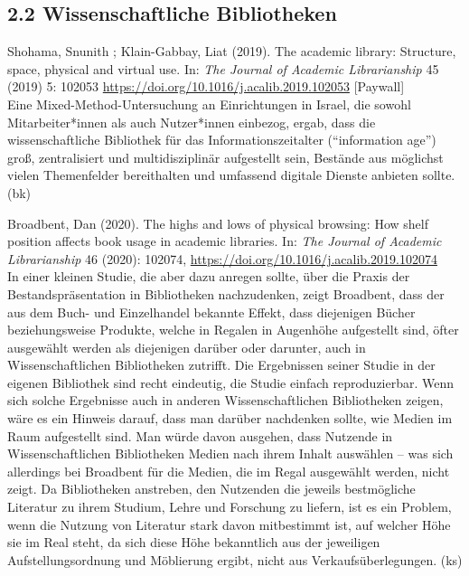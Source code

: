 \documentclass[a4paper,
fontsize=11pt,
oneside,
numbers=noperiodatend,
parskip=half-,
bibliography=totoc,
final
]{scrartcl}
\begin{document}
\hypertarget{wissenschaftliche-bibliotheken}{%
\subsection{2.2 Wissenschaftliche
Bibliotheken}\label{wissenschaftliche-bibliotheken}}

Shohama, Snunith ; Klain-Gabbay, Liat (2019). The academic library:
Structure, space, physical and virtual use. In: \emph{The Journal of
Academic Librarianship} 45 (2019) 5: 102053
\url{https://doi.org/10.1016/j.acalib.2019.102053} {[}Paywall{]}\\
Eine Mixed-Method-Untersuchung an Einrichtungen in Israel, die sowohl
Mitarbeiter*innen als auch Nutzer*innen einbezog, ergab, dass die
wissenschaftliche Bibliothek für das Informationszeitalter
(``information age'') groß, zentralisiert und multidisziplinär
aufgestellt sein, Bestände aus möglichst vielen Themenfelder
bereithalten und umfassend digitale Dienste anbieten sollte. (bk)

Broadbent, Dan (2020). The highs and lows of physical browsing: How
shelf position affects book usage in academic libraries. In: \emph{The
Journal of Academic Librarianship} 46 (2020): 102074,
\url{https://doi.org/10.1016/j.acalib.2019.102074}\\
In einer kleinen Studie, die aber dazu anregen sollte, über die Praxis
der Bestandspräsentation in Bibliotheken nachzudenken, zeigt Broadbent,
dass der aus dem Buch- und Einzelhandel bekannte Effekt, dass diejenigen
Bücher beziehungsweise Produkte, welche in Regalen in Augenhöhe
aufgestellt sind, öfter ausgewählt werden als diejenigen darüber oder
darunter, auch in Wissenschaftlichen Bibliotheken zutrifft. Die
Ergebnissen seiner Studie in der eigenen Bibliothek sind recht
eindeutig, die Studie einfach reproduzierbar. Wenn sich solche
Ergebnisse auch in anderen Wissenschaftlichen Bibliotheken zeigen, wäre
es ein Hinweis darauf, dass man darüber nachdenken sollte, wie Medien im
Raum aufgestellt sind. Man würde davon ausgehen, dass Nutzende in
Wissenschaftlichen Bibliotheken Medien nach ihrem Inhalt auswählen --
was sich allerdings bei Broadbent für die Medien, die im Regal
ausgewählt werden, nicht zeigt. Da Bibliotheken anstreben, den Nutzenden
die jeweils bestmögliche Literatur zu ihrem Studium, Lehre und Forschung
zu liefern, ist es ein Problem, wenn die Nutzung von Literatur stark
davon mitbestimmt ist, auf welcher Höhe sie im Real steht, da sich diese
Höhe bekanntlich aus der jeweiligen Aufstellungsordnung und Möblierung
ergibt, nicht aus Verkaufsüberlegungen. (ks)
\end{document}
